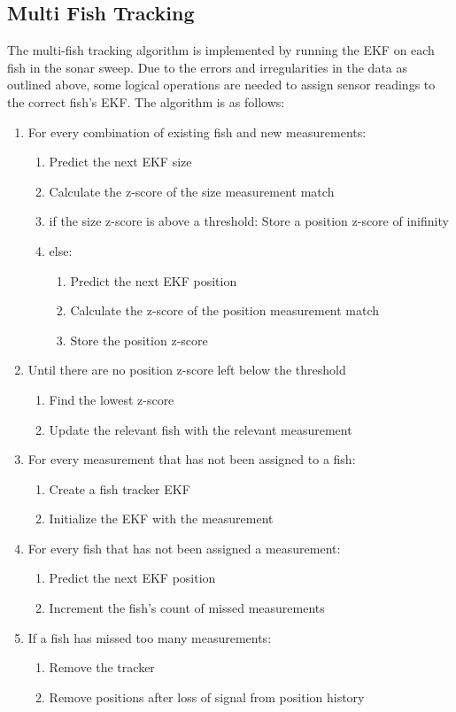 \documentclass[12pt]{article}
\begin{document}
\subsection{Multi Fish Tracking}\label{sec:p1-multi-fish-tracking}
The multi-fish tracking algorithm is implemented by running the EKF on each fish in the sonar sweep. Due to the errors and irregularities in the data as outlined above, some logical operations are needed to assign sensor readings to the correct fish's EKF. The algorithm is as follows:

\begin{enumerate}
    \item For every combination of existing fish and new measurements:
    \begin{enumerate}
        \item Predict the next EKF size
        \item Calculate the z-score of the size measurement match
        \item if the size z-score is above a threshold: Store a position z-score of inifinity
        \item else:
        \begin{enumerate}
            \item Predict the next EKF position
            \item Calculate the z-score of the position measurement match
            \item Store the position z-score
        \end{enumerate}
    \end{enumerate}
    \item Until there are no position z-score left below the threshold
    \begin{enumerate}
        \item Find the lowest z-score
        \item Update the relevant fish with the relevant measurement
    \end{enumerate}
    \item For every measurement that has not been assigned to a fish:
    \begin{enumerate}
        \item Create a fish tracker EKF
        \item Initialize the EKF with the measurement
    \end{enumerate}
    \item For every fish that has not been assigned a measurement:
    \begin{enumerate}
        \item Predict the next EKF position
        \item Increment the fish's count of missed measurements
    \end{enumerate}
    \item If a fish has missed too many measurements:
    \begin{enumerate}
        \item Remove the tracker
        \item Remove positions after loss of signal from position history
    \end{enumerate}
\end{enumerate}
\end{document}
